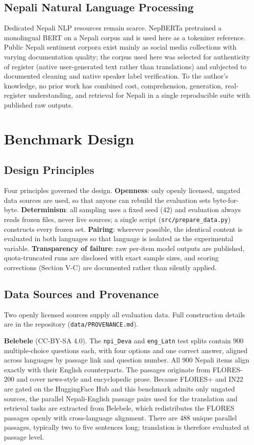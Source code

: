 \documentclass[conference]{IEEEtran}
\begin{document}
\subsection{Nepali Natural Language Processing}
Dedicated Nepali NLP resources remain scarce. NepBERTa \cite{timilsina2022nepberta} pretrained a monolingual BERT on a Nepali corpus and is used here as a tokenizer reference. Public Nepali sentiment corpora exist mainly as social media collections with varying documentation quality; the corpus used here was selected for authenticity of register (native user-generated text rather than translations) and subjected to documented cleaning and native speaker label verification. To the author's knowledge, no prior work has combined cost, comprehension, generation, real-register understanding, and retrieval for Nepali in a single reproducible suite with published raw outputs.

\section{Benchmark Design}
\subsection{Design Principles}
Four principles governed the design. \textbf{Openness}: only openly licensed, ungated data sources are used, so that anyone can rebuild the evaluation sets byte-for-byte. \textbf{Determinism}: all sampling uses a fixed seed (42) and evaluation always reads frozen files, never live sources; a single script (\texttt{src/prepare\_data.py}) constructs every frozen set. \textbf{Pairing}: wherever possible, the identical content is evaluated in both languages so that language is isolated as the experimental variable. \textbf{Transparency of failure}: raw per-item model outputs are published, quota-truncated runs are disclosed with exact sample sizes, and scoring corrections (Section V-C) are documented rather than silently applied.

\subsection{Data Sources and Provenance}
Two openly licensed sources supply all evaluation data. Full construction details are in the repository (\texttt{data/PROVENANCE.md}).

\textbf{Belebele} \cite{bandarkar2024belebele} (CC-BY-SA 4.0). The \texttt{npi\_Deva} and \texttt{eng\_Latn} test splits contain 900 multiple-choice questions each, with four options and one correct answer, aligned across languages by passage link and question number. All 900 Nepali items align exactly with their English counterparts. The passages originate from FLORES-200 and cover news-style and encyclopedic prose. Because FLORES+ and IN22 are gated on the HuggingFace Hub and this benchmark admits only ungated sources, the parallel Nepali-English passage pairs used for the translation and retrieval tasks are extracted from Belebele, which redistributes the FLORES passages openly with cross-language alignment. There are 488 unique parallel passages, typically two to five sentences long; translation is therefore evaluated at passage level.
\end{document}
